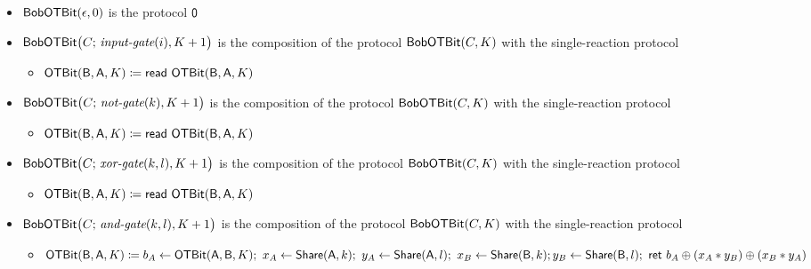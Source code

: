 \begin{itemize}
\item $\mathsf{BobOTBit}(\epsilon,0)$ is the protocol $\mathsf{0}$
\item $\mathsf{BobOTBit}\big(C; \, \textit{input-gate}(i),K+1\big)$ is the composition of the protocol $\mathsf{BobOTBit}(C,K)$ with the single-reaction protocol
\begin{itemize}
\item $\mathsf{OTBit}(\mathsf{B},\mathsf{A},K) \coloneqq \mathsf{read} \ \mathsf{OTBit}(\mathsf{B},\mathsf{A},K)$
\end{itemize}
\item $\mathsf{BobOTBit}\big(C; \, \textit{not-gate}(k),K+1\big)$ is the composition of the protocol $\mathsf{BobOTBit}(C,K)$ with the single-reaction protocol
\begin{itemize}
\item $\mathsf{OTBit}(\mathsf{B},\mathsf{A},K) \coloneqq \mathsf{read} \ \mathsf{OTBit}(\mathsf{B},\mathsf{A},K)$
\end{itemize}
\item $\mathsf{BobOTBit}\big(C; \, \textit{xor-gate}(k,l),K+1\big)$ is the composition of the protocol $\mathsf{BobOTBit}(C,K)$ with the single-reaction protocol
\begin{itemize}
\item $\mathsf{OTBit}(\mathsf{B},\mathsf{A},K) \coloneqq \mathsf{read} \ \mathsf{OTBit}(\mathsf{B},\mathsf{A},K)$
\end{itemize}
\item $\mathsf{BobOTBit}\big(C; \, \textit{and-gate}(k,l),K+1\big)$ is the composition of the protocol $\mathsf{BobOTBit}(C,K)$ with the single-reaction protocol
\begin{itemize}
\item $\mathsf{OTBit}(\mathsf{B},\mathsf{A},K) \coloneqq b_A \leftarrow \mathsf{OTBit}(\mathsf{A},\mathsf{B},K); \ x_A \leftarrow \mathsf{Share}(\mathsf{A},k); \ y_A \leftarrow \mathsf{Share}(\mathsf{A},l); \ x_B \leftarrow \mathsf{Share}(\mathsf{B},k); \\ y_B \leftarrow \mathsf{Share}(\mathsf{B},l); \ \mathsf{ret} \ b_A \oplus (x_A * y_B) \oplus (x_B * y_A)$
\end{itemize}
\end{itemize}

